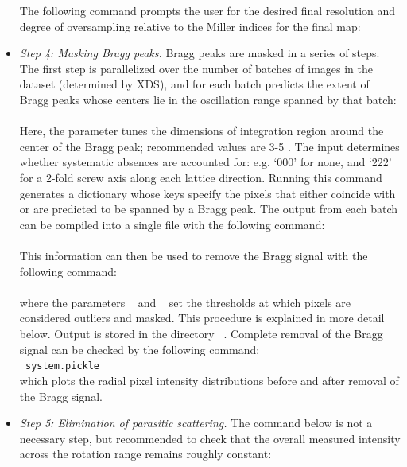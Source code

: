 \documentclass{article}
\begin{document}
\begin{itemize}
The following command prompts the user for the desired final resolution and degree of oversampling relative to the Miller indices for the final map:
\\[0.2cm]
\texttt{}
%
\item \emph{Step 4: Masking Bragg peaks.} 
Bragg peaks are masked in a series of steps. The first step is parallelized over the number of batches of images in the dataset (determined by XDS), and for each batch predicts the extent of Bragg peaks whose centers lie in the oscillation range spanned by that batch:
\\[0.2cm]
\texttt{}
\\[0.2cm]
Here, the \texttt{} parameter tunes the dimensions of integration region around the center of the Bragg peak; recommended values are 3-5 \cite{pmid20124693}. The \texttt{} input determines whether systematic absences are accounted for: e.g. `000' for none, and `222' for a 2-fold screw axis along each lattice direction. Running this command generates a dictionary whose keys specify the pixels that either coincide with or are predicted to be spanned by a Bragg peak. The output from each batch can be compiled into a single file with the following command: 
\\[0.2cm]
\texttt{ }
\\[0.2cm]
This information can then be used to remove the Bragg signal with the following command:
\\[0.2cm]
\texttt{ }
\\[0.2cm]
where the parameters \texttt{ } and \texttt{ } set the thresholds at which pixels are considered outliers and masked. This procedure is explained in more detail below. Output is stored in the directory \texttt{ }. Complete removal of the Bragg signal can be checked by the following command:
\\[0.2cm]
\texttt{  system.pickle}
\\[0.2cm]
which plots the radial pixel intensity distributions before and after removal of the Bragg signal.
%
\item \emph{Step 5: Elimination of parasitic scattering.} 
The command below is not a necessary step, but recommended to check that the overall measured intensity across the rotation range remains roughly constant:

\end{itemize}
\end{document}
